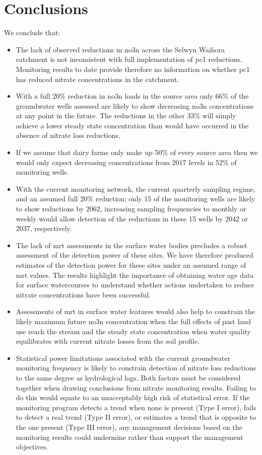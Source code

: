 
\section[Conclusions]{Conclusions} \label{sec:conclusions}

We conclude that:
\begin{itemize}
    \item The lack of observed reductions in \gls{no3n} across the Selwyn Waihora catchment is not inconsistent with full implementation of \gls{pc1} reductions. Monitoring results to date provide therefore no information on whether \gls{pc1} has reduced nitrate concentrations in the catchment.
    \item With a full 20\% reduction in \gls{no3n} loads in the source area only 66\% of the groundwater wells assessed are likely to show decreasing \gls{no3n} concentrations at any point in the future. The reductions in the other 33\% will simply achieve a lower steady state concentration than would have occurred in the absence of nitrate loss reductions.
    \item If we assume that dairy farms only make up 50\% of every source area then we would only expect decreasing concentrations from 2017 levels in 52\% of monitoring wells.
    \item With the current monitoring network, the current quarterly sampling regime, and an assumed full 20\% reduction; only 15 of the monitoring wells are likely to show reductions by 2062, increasing sampling frequencies to monthly or weekly would allow detection of the reductions in these 15 wells by 2042 or 2037, respectively.
    \item The lack of \gls{mrt} assessments in the surface water bodies precludes a robust assessment of the detection power of these sites. We have therefore produced estimates of the detection power for these sites under an assumed range of \gls{mrt} values. The results highlight the importance of obtaining water age data for surface watercourses to understand whether actions undertaken to reduce nitrate concentrations have been successful.
    \item Assessments of \gls{mrt} in surface water features would also help to constrain the likely maximum future \gls{no3n} concentration when the full effects of past land use reach the stream and the steady state concentration when water quality equilibrates with current nitrate losses from the soil profile.
    \item Statistical power limitations associated with the current groundwater monitoring frequency is likely to constrain detection of nitrate loss reductions to the same degree as hydrological lags. Both factors must be considered together when drawing conclusions from nitrate monitoring results. Failing to do this would equate to an unacceptably high risk of statistical error. If the monitoring program detects a trend when none is present (Type I error), fails to detect a real trend (Type II error), or estimates a trend that is opposite to the one present (Type III error), any management decisions based on the monitoring results could undermine rather than support the management objectives.

\end{itemize}
